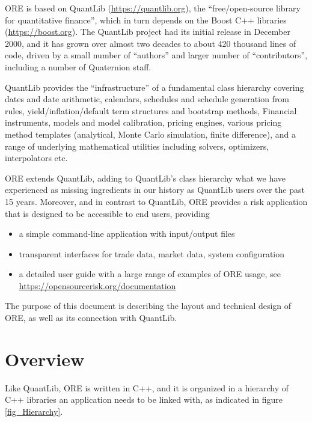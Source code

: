 \documentclass[12pt, a4paper]{article}
\begin{document}
ORE is based on QuantLib (\url{https://quantlib.org}), the ``free/open-source library for quantitative finance'', which in turn depends on the Boost C++ libraries (\url{https://boost.org}). 
The QuantLib project had its initial release in December 2000, and it has grown over almost two decades to about 420 thousand lines of code, driven by a small number of ``authors'' and larger number of ``contributors'', including a number of Quaternion staff.

QuantLib provides the ``infrastructure'' of a fundamental class hierarchy covering dates and date arithmetic, calendars, schedules and schedule generation from rules, yield/inflation/default term structures and bootstrap methods,
Financial instruments, models and model calibration, pricing engines, various pricing method templates (analytical, Monte Carlo simulation, finite difference), and a range of underlying mathematical utilities including solvers, optimizers, interpolators etc.

ORE extends QuantLib, adding to QuantLib's class hierarchy what we have experienced as missing ingredients in our history as QuantLib users over the past 15 years.
Moreover, and in contrast to QuantLib, ORE provides a risk application that is designed to be accessible to end users, providing

\begin{itemize}
\item a simple command-line application with input/output files
\item transparent interfaces for trade data, market data, system configuration
\item a detailed user guide with a large range of examples of ORE usage, see \url{https://opensourcerisk.org/documentation}
\end{itemize}

The purpose of this document is describing the layout and technical design of ORE, as well as its connection with QuantLib.


\section{Overview}
Like QuantLib, ORE is written in C++, and it is organized in a hierarchy of C++ libraries an application needs to be linked with, as indicated in figure \ref{fig_Hierarchy}.
\end{document}
